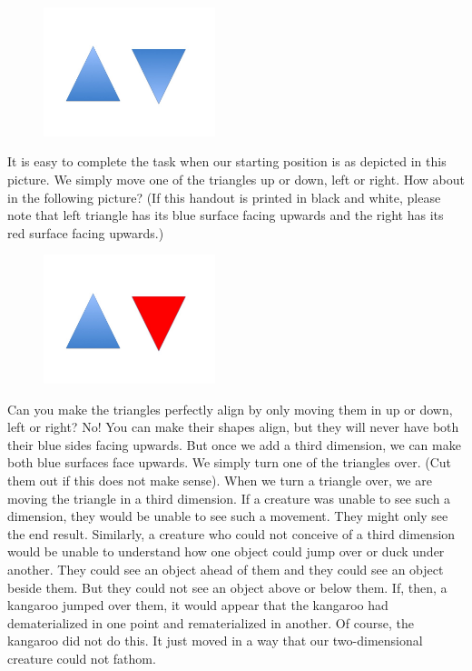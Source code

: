 \documentclass[oneside]{article}
\begin{document}
\begin{figure}[h]
\centering
  \includegraphics[width=50mm]{2d.jpg}
\end{figure}

It is easy to complete the task when our starting position is as depicted in this picture. We simply move one of the triangles up or down, left or right. How about in the following picture? (If this handout is printed in black and white, please note that left triangle has its blue surface facing upwards and the right has its red surface facing upwards.)




\begin{figure}[h]
\centering
  \includegraphics[width=50mm]{3d.jpg}
\end{figure}

Can you make the triangles perfectly align by only moving them in up or down, left or right? No! You can make their shapes align, but they will never have both their blue sides facing upwards. But once we add a third dimension, we can make both blue surfaces face upwards. We simply turn one of the triangles over.  (Cut them out if this does not make sense). When we turn a triangle over, we are moving the triangle in a third dimension. If a creature was unable to see such a dimension, they would be unable to see such a movement. They might only see the end result. Similarly, a creature who could not conceive of a third dimension would be unable to understand how one object could jump over or duck under another.  They could see an object ahead of them and they could see an object beside them. But they could not see an object above or below them. If, then, a kangaroo jumped over them, it would appear that the kangaroo had dematerialized in one point and rematerialized in another. Of course, the kangaroo did not do this. It just moved in a way that our two-dimensional creature could not fathom. 
\end{document}
